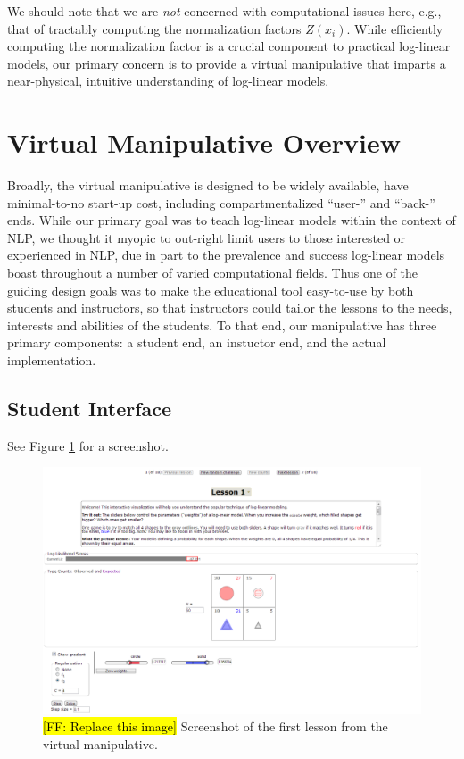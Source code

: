 \documentclass[11pt,letterpaper]{article}
\newcommand{\Note}[1]{}
\renewcommand{\Note}[1]{\hl{[#1]}}
\newcommand{\NoteSigned}[3]{{\sethlcolor{#2}\Note{#1: #3}}}
\newcommand{\NoteFF}[1]{\NoteSigned{FF}{LightBlue}{#1}}
\begin{document}
We should note that we are \textit{not} concerned with computational issues here, e.g., that of tractably computing the normalization factors $Z(x_i)$. While efficiently computing the normalization factor is a crucial component to practical log-linear models, our primary concern is to provide a virtual manipulative that imparts a near-physical, intuitive understanding of log-linear models. 


\section{Virtual Manipulative Overview}\label{sec:overview}
Broadly, the virtual manipulative is designed to be widely available, have minimal-to-no start-up cost, including compartmentalized ``user-'' and ``back-'' ends. While our primary goal was to teach log-linear models within the context of NLP, we thought it myopic to out-right limit users to those interested or experienced in NLP, due in part to the prevalence and success log-linear models boast throughout a number of varied computational fields. Thus one of the guiding design goals was to make the educational tool easy-to-use by both students and instructors, so that instructors could tailor the lessons to the needs, interests and abilities of the students. To that end, our manipulative has three primary components: a student end, an instuctor end, and the actual implementation.

\subsection{Student Interface}
 See Figure \ref{fig:lesson1} for a screenshot.
\begin{figure}[t]
\includegraphics[scale=.5]{images/lesson1-grad-moved-nonewcounts-ell2-c4.PNG}
\caption{\NoteFF{Replace this image} Screenshot of the first lesson from the virtual manipulative.}
\label{fig:lesson1}
\end{figure}
\end{document}
